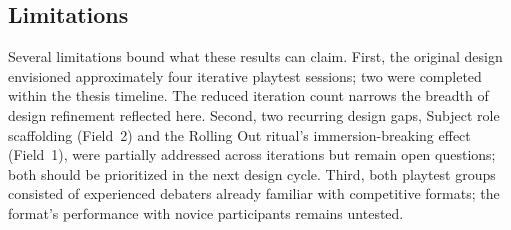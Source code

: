 \subsection{Limitations}

Several limitations bound what these results can claim. First, the original design envisioned approximately four iterative playtest sessions; two were completed within the thesis timeline. The reduced iteration count narrows the breadth of design refinement reflected here. Second, two recurring design gaps, Subject role scaffolding (Field~2) and the Rolling Out ritual's immersion-breaking effect (Field~1), were partially addressed across iterations but remain open questions; both should be prioritized in the next design cycle. Third, both playtest groups consisted of experienced debaters already familiar with competitive formats; the format's performance with novice participants remains untested.
